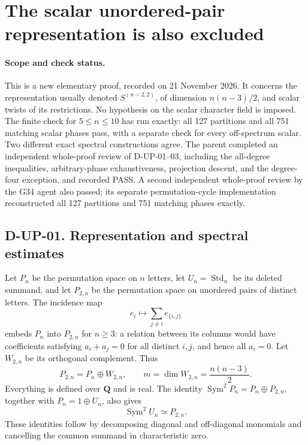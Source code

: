 \section{The scalar unordered-pair representation is also excluded}
\label{sec:unordered-pair-obstruction}

\paragraph{Scope and check status.}
This is a new elementary proof, recorded on 21 November 2026.
It concerns the representation usually denoted $S^{(n-2,2)}$,
of dimension $n(n-3)/2$, and scalar twists of its restrictions.
No hypothesis on the scalar character field is imposed.
The finite check for $5\le n\le10$ has run exactly: all 127
partitions and all 751 matching scalar phases pass, with a separate
check for every off-spectrum scalar.  Two different exact spectral
constructions agree.  The parent completed an independent whole-proof
review of D-UP-01--03, including the all-degree inequalities, arbitrary-phase
exhaustiveness, projection descent, and the degree-four exception, and
recorded PASS.  A second independent whole-proof review by the G34
agent also passed; its separate permutation-cycle implementation
reconstructed all 127 partitions and 751 matching phases exactly.

\subsection*{D-UP-01. Representation and spectral estimates}

Let $P_n$ be the permutation space on $n$ letters, let
$U_n=\operatorname{Std}_n$ be its deleted summand, and let $P_{2,n}$
be the permutation space on unordered pairs of distinct letters.
The incidence map
\[
        e_i\longmapsto\sum_{j\ne i}e_{\{i,j\}}
\]
embeds $P_n$ into $P_{2,n}$ for $n\ge3$: a relation between its
columns would have coefficients satisfying $a_i+a_j=0$ for all
distinct $i,j$, and hence all $a_i=0$.
Let $W_{2,n}$ be its orthogonal complement.  Thus
\[
  P_{2,n}=P_n\oplus W_{2,n},\qquad
  m=\dim W_{2,n}=\frac{n(n-3)}2.                       \tag{UP.1}
\]
Everything is defined over $\mathbf Q$ and is real.
The identity
$\operatorname{Sym}^2P_n=P_n\oplus P_{2,n}$, together with
$P_n=1\oplus U_n$, also gives
\[
          \operatorname{Sym}^2U_n\simeq P_{2,n}.
                                                               \tag{UP.2}
\]
These identities follow by decomposing diagonal and off-diagonal
monomials and cancelling the common summand in characteristic zero.

